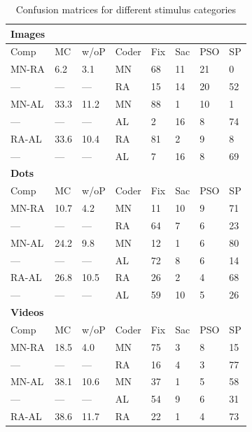 
\begin{table}[h!]
	\caption{Confusion matrices for different stimulus categories}
	\label{tab:mclf}       %
	\begin{tabular}{llllllll}
		\textbf{Images}&&&&&&&\\
		\hline\noalign{\smallskip}
		Comp & MC & w/oP & Coder & Fix & Sac & PSO & SP \\
		\noalign{\smallskip}\hline\noalign{\smallskip}
		MN-RA & 6.2 & 3.1 & MN & 68 & 11 & 21 & 0  \\
		--- & --- & --- & RA & 15 & 14 & 20 & 52 \\
		MN-AL & 33.3 & 11.2 & MN & 88 & 1 & 10 & 1 \\
		--- & --- & --- & AL & 2 &  16 & 8 & 74 \\
		RA-AL & 33.6 & 10.4 & RA & 81 & 2 & 9 & 8 \\
		---& ---& ---& AL & 7 & 16 & 8 & 69 \\
		\noalign{\smallskip}
		\textbf{Dots}&&&&&&&\\
		\hline\noalign{\smallskip}
		Comp & MC & w/oP & Coder & Fix & Sac & PSO & SP \\
		\noalign{\smallskip}\hline\noalign{\smallskip}
		MN-RA & 10.7 & 4.2 & MN & 11 & 10 & 9 & 71  \\
		--- & --- & --- & RA & 64 & 7 & 6 & 23 \\
		MN-AL & 24.2 & 9.8 & MN & 12 & 1 & 6 & 80 \\
		--- & --- & --- & AL & 72 & 8 & 6 & 14\\
		RA-AL & 26.8 & 10.5 & RA & 26 & 2 & 4 & 68 \\
		---& ---& ---& AL & 59 & 10 & 5 & 26 \\
		\noalign{\smallskip}
		\textbf{Videos}&&&&&&&\\
		\hline\noalign{\smallskip}
		Comp & MC & w/oP & Coder & Fix & Sac & PSO & SP \\
		\noalign{\smallskip}\hline\noalign{\smallskip}
		MN-RA & 18.5 & 4.0 & MN & 75 & 3 & 8 & 15 \\
		--- & --- & --- & RA & 16 & 4 & 3 & 77 \\
		MN-AL & 38.1 & 10.6 & MN & 37 & 1 & 5 & 58 \\
		--- & --- & --- & AL & 54 & 9 & 6 & 31\\
		RA-AL & 38.6 & 11.7 & RA & 22 & 1 & 4 & 73 \\

\end{tabular}
\end{table}
